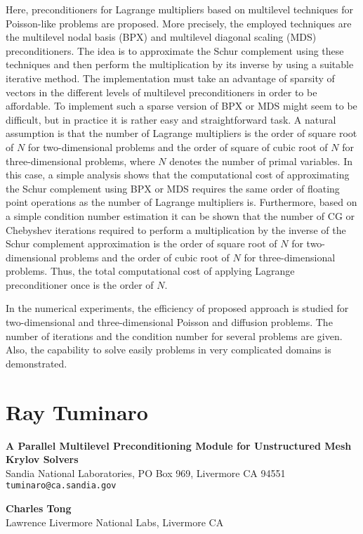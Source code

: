 \documentclass[11pt]{article}
\newcommand{\nextab}[4]{
	\section{#2}
	{\bf #1} \\ \nopagebreak
	{#3} \\ \nopagebreak
	{\tt #4} \nopagebreak
	}
\begin{document}
Here, preconditioners for Lagrange multipliers based on multilevel
techniques for Poisson-like problems are proposed. More precisely, the
employed techniques are the multilevel nodal basis (BPX) and multilevel
diagonal scaling (MDS) preconditioners. The idea is to approximate
the Schur complement using these techniques and then perform the
multiplication by its inverse by using a suitable iterative method.
The implementation must take an advantage of sparsity of vectors
in the different levels of multilevel preconditioners in order to be
affordable. To implement such a sparse version of BPX or MDS might seem
to be difficult, but in practice it is rather easy and straightforward task.
A natural assumption is that the number of Lagrange multipliers is the
order of square root of $N$ for two-dimensional problems and the order of
square of cubic root of $N$ for three-dimensional problems, where $N$ denotes
the number of primal variables. In this case, a simple analysis shows
that the computational cost of approximating the Schur complement using
BPX or MDS requires the same order of floating point operations as
the number of Lagrange multipliers is. Furthermore, based on a simple
condition number estimation it can be shown that the number of CG or
Chebyshev iterations required to perform a multiplication by the inverse
of the Schur complement approximation is the order of square root of $N$
for two-dimensional problems and the order of cubic root of $N$ for
three-dimensional problems. Thus, the total computational cost of
applying Lagrange preconditioner once is the order of $N$.



In the numerical experiments, the efficiency of proposed approach
is studied for two-dimensional and three-dimensional Poisson and diffusion
problems. The number of iterations and the condition number for several
problems are given. Also, the capability to solve easily problems in very
complicated domains is demonstrated.




\nextab
{A Parallel Multilevel Preconditioning Module for Unstructured Mesh Krylov Solvers}
{Ray Tuminaro}
{Sandia National Laboratories, PO Box 969, Livermore CA 94551}
{tuminaro@ca.sandia.gov}

{\bf Charles Tong} \\
Lawrence Livermore National Labs, Livermore CA
\end{document}
